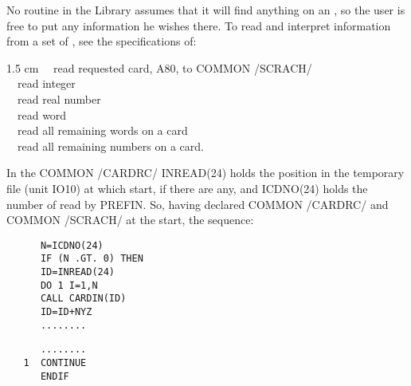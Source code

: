 \cardend\newpage
{}
No routine in the Library assumes that it will find anything on an ,
so the user is free to put any information he wishes there.  To
read and interpret information from a set of , see the
specifications of:
\ssk
\begin{varindent} {1.5 cm}
 \ \ read requested card, A80, to COMMON /SCRACH/\\
 \ \ read integer\\
 \ \ read real number\\
 \ \ read word\\
 \ \ read all remaining words on a card\\
 \ \ read all remaining numbers on a card.
\end{varindent}\p 
In the COMMON /CARDRC/ INREAD(24) holds the position in the temporary
file (unit IO10) at which  start, if there are any, and
ICDNO(24) holds the number of  read by PREFIN.
\p 
So, having declared COMMON /CARDRC/ and COMMON /SCRACH/ at the start, the 
sequence:
\ssk
\begin{verbatim}
      N=ICDNO(24)
      IF (N .GT. 0) THEN
      ID=INREAD(24)
      DO 1 I=1,N
      CALL CARDIN(ID)
      ID=ID+NYZ
      ........
\end{verbatim}
\begin{varindent}{1 cm}\end{varindent}
\ssk\begin{verbatim}
      ........
   1  CONTINUE
      ENDIF
\end{verbatim}
